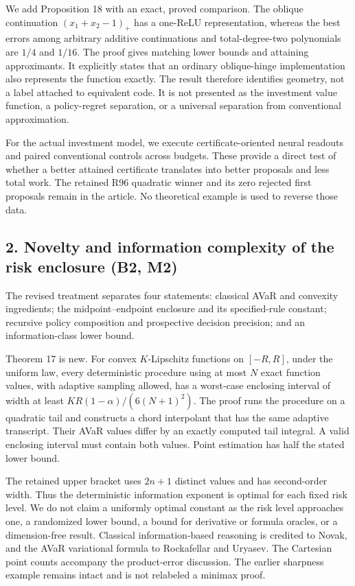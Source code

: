 We add Proposition 18 with an exact, proved comparison. The oblique
continuation \((x_1+x_2-1)_+\) has a one-ReLU representation, whereas
the best errors among arbitrary additive continuations and
total-degree-two polynomials are \(1/4\) and \(1/16\). The proof gives
matching lower bounds and attaining approximants. It explicitly states
that an ordinary oblique-hinge implementation also represents the
function exactly. The result therefore identifies geometry, not a label
attached to equivalent code. It is not presented as the investment value
function, a policy-regret separation, or a universal separation from
conventional approximation.

For the actual investment model, we execute certificate-oriented neural
readouts and paired conventional controls across budgets. These provide
a direct test of whether a better attained certificate translates into
better proposals and less total work. The retained R96 quadratic winner
and its zero rejected first proposals remain in the article. No
theoretical example is used to reverse those data.

\hypertarget{novelty-and-information-complexity-of-the-risk-enclosure-b2-m2}{%
\subsection{2. Novelty and information complexity of the risk enclosure
(B2,
M2)}\label{novelty-and-information-complexity-of-the-risk-enclosure-b2-m2}}

The revised treatment separates four statements: classical AVaR and
convexity ingredients; the midpoint--endpoint enclosure and its
specified-rule constant; recursive policy composition and prospective
decision precision; and an information-class lower bound.

Theorem 17 is new. For convex \(K\)-Lipschitz functions on \([-R,R]\),
under the uniform law, every deterministic procedure using at most \(N\)
exact function values, with adaptive sampling allowed, has a worst-case
enclosing interval of width at least \(KR(1-\alpha)/(6(N+1)^2)\). The
proof runs the procedure on a quadratic tail and constructs a chord
interpolant that has the same adaptive transcript. Their AVaR values
differ by an exactly computed tail integral. A valid enclosing interval
must contain both values. Point estimation has half the stated lower
bound.

The retained upper bracket uses \(2n+1\) distinct values and has
second-order width. Thus the deterministic information exponent is
optimal for each fixed risk level. We do not claim a uniformly optimal
constant as the risk level approaches one, a randomized lower bound, a
bound for derivative or formula oracles, or a dimension-free result.
Classical information-based reasoning is credited to Novak, and the AVaR
variational formula to Rockafellar and Uryasev. The Cartesian point
counts accompany the product-error discussion. The earlier sharpness
example remains intact and is not relabeled a minimax proof.

